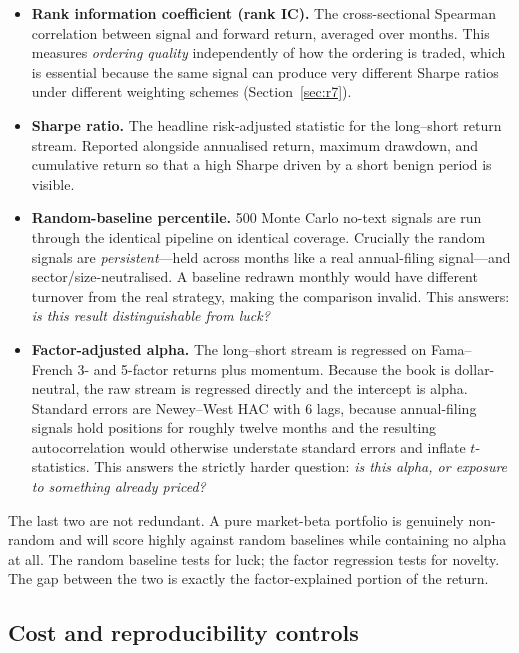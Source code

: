 \documentclass[11pt]{article}
\begin{document}
\begin{itemize}[leftmargin=1.4em,itemsep=0.3em]
  \item \textbf{Rank information coefficient (rank IC).} The cross-sectional Spearman
        correlation between signal and forward return, averaged over months. This measures
        \emph{ordering quality} independently of how the ordering is traded, which is
        essential because the same signal can produce very different Sharpe ratios under
        different weighting schemes (Section~\ref{sec:r7}).
  \item \textbf{Sharpe ratio.} The headline risk-adjusted statistic for the long--short
        return stream. Reported alongside annualised return, maximum drawdown, and
        cumulative return so that a high Sharpe driven by a short benign period is visible.
  \item \textbf{Random-baseline percentile.} 500 Monte Carlo no-text signals are run
        through the identical pipeline on identical coverage. Crucially the random signals
        are \emph{persistent}---held across months like a real annual-filing signal---and
        sector/size-neutralised. A baseline redrawn monthly would have different turnover
        from the real strategy, making the comparison invalid. This answers: \emph{is this
        result distinguishable from luck?}
  \item \textbf{Factor-adjusted alpha.} The long--short stream is regressed on Fama--French
        3- and 5-factor returns plus momentum. Because the book is dollar-neutral, the raw
        stream is regressed directly and the intercept is alpha. Standard errors are
        Newey--West HAC with 6 lags, because annual-filing signals hold positions for
        roughly twelve months and the resulting autocorrelation would otherwise understate
        standard errors and inflate $t$-statistics. This answers the strictly harder
        question: \emph{is this alpha, or exposure to something already priced?}
\end{itemize}

The last two are not redundant. A pure market-beta portfolio is genuinely non-random and
will score highly against random baselines while containing no alpha at all. The random
baseline tests for luck; the factor regression tests for novelty. The gap between the two
is exactly the factor-explained portion of the return.

\subsection{Cost and reproducibility controls}
\end{document}
